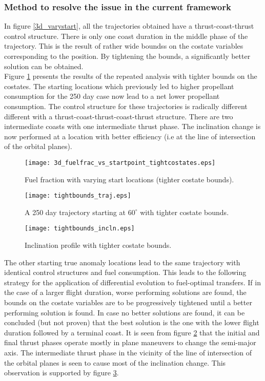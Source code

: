\subsubsection{Method to resolve the issue in the current framework}
In figure \ref{3d_varystart}, all the trajectories obtained have a thrust-coast-thrust control structure. There is only one coast duration in the middle phase of the trajectory. This is the result of rather wide boundss on the costate variables corresponding to the position. By tightening the bounds, a significantly better solution can be obtained.\\
Figure \ref{3d_varystart_tightcostates} presents the results of the repeated analysis with tighter bounds on the costates. The starting locations which previously led to higher propellant consumption for the 250 day case now lead to a net lower propellant consumption. The control structure for these trajectories is radically different different with a thrust-coast-thrust-coast-thrust structure. There are two intermediate coasts with one intermediate thrust phase. The inclination change is now performed at a location with better efficiency (i.e at the line of intersection of the orbital planes). 
\begin{figure}[H]
	\centering\texttt{[image: 3d\_fuelfrac\_vs\_startpoint\_tightcostates.eps]}
	\caption{Fuel fraction with varying start locations (tighter costate bounds).}
	\label{3d_varystart_tightcostates}
\end{figure}
\begin{figure}[H]
	\centering\texttt{[image: tightbounds\_traj.eps]}
	\caption{A 250 day trajectory starting at $60^\circ$ with tighter costate bounds.}
	\label{3d_traj_tightcostates}
\end{figure}
\begin{figure}[H]
	\centering\texttt{[image: tightbounds\_incln.eps]}
	\caption{Inclination profile with tighter costate bounds.}
	\label{3d_traj_tightcostates_incl}
\end{figure}
The other starting true anomaly locations lead to the same trajectory with identical control structures and fuel consumption. This leads to the following strategy for the application of differential evolution to fuel-optimal transfers. If in the case of a larger flight duration, worse performing solutions are found, the bounds on the costate variables are to be progressively tightened until a better performing solution is found. In case no better solutions are found, it can be concluded (but not proven) that the best solution is the one with the lower flight duration followed by a terminal coast. It is seen from figure \ref{3d_traj_tightcostates} that the initial and final thrust phases operate mostly in plane maneuvers to change the semi-major axis. The intermediate thrust phase in the vicinity of the line of intersection of the orbital planes is seen to cause most of the inclination change. This observation is supported by figure \ref{3d_traj_tightcostates_incl}.\\
